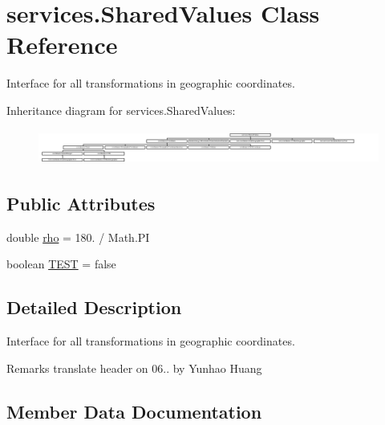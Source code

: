 \hypertarget{interfaceservices_1_1_shared_values}{}\section{services.\+Shared\+Values Class Reference}
\label{interfaceservices_1_1_shared_values}


Interface for all transformations in geographic coordinates.  


Inheritance diagram for services.\+Shared\+Values\+:\begin{figure}[H]
\begin{center}
\leavevmode
\includegraphics[height=1.151316cm]{interfaceservices_1_1_shared_values}
\end{center}
\end{figure}
\subsection*{Public Attributes}
\begin{DoxyCompactItemize}
\item 
double \hyperlink{interfaceservices_1_1_shared_values_a8cec608e2d63290f96b9f3da3d9c7dd5}{rho} = 180. / Math.\+PI
\item 
boolean \hyperlink{interfaceservices_1_1_shared_values_a549c2189db6344640733fa2591ba9048}{T\+E\+ST} = false
\end{DoxyCompactItemize}


\subsection{Detailed Description}
Interface for all transformations in geographic coordinates. 

\begin{DoxyRemark}{Remarks}
translate header on 06.. by Yunhao Huang 
\end{DoxyRemark}


\subsection{Member Data Documentation}
\mbox{\label{interfaceservices_1_1_shared_values_a8cec608e2d63290f96b9f3da3d9c7dd5}} 
